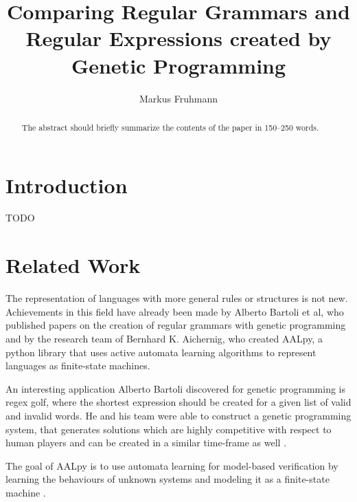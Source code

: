 \documentclass[runningheads]{llncs}
\begin{document}
\lstset{language=Clojure}
%
\title{Comparing Regular Grammars and Regular Expressions created by Genetic Programming}
%
%
\author{Markus Fruhmann}
%
%
%
\maketitle              %
%
\begin{abstract}
The abstract should briefly summarize the contents of the paper in
150--250 words.

\end{abstract}
%
%
%
\section{Introduction}
TODO

\section{Related Work}
The representation of languages with more general rules or structures is not new. Achievements in this field have already been made by Alberto Bartoli et al, who published papers on the creation of regular grammars with genetic programming and by the research team of Bernhard K. Aichernig, who created AALpy, a python library that uses active automata learning algorithms to represent languages as finite-state machines.

An interesting application Alberto Bartoli discovered for genetic programming is regex golf, where the shortest expression should be created for a given list of valid and invalid words. He and his team were able to construct a genetic programming system, that generates solutions which are highly competitive with respect to human players and can be created in a similar time-frame as well \cite{regolf-2014}.

The goal of AALpy is to use automata learning for model-based verification by learning the behaviours of unknown systems and modeling it as a finite-state machine \cite{aalpy-2022}.
\end{document}
